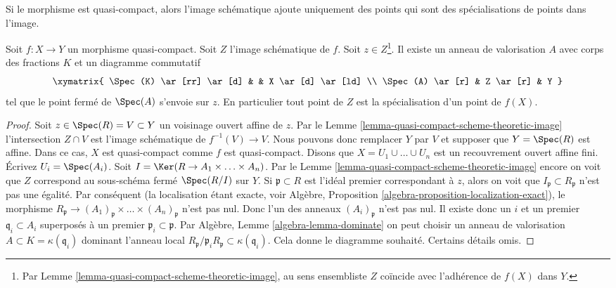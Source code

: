 \noindent
Si le morphisme est quasi-compact, alors l'image schématique ajoute uniquement
des points qui sont des spécialisations de points dans l'image.

\begin{lemma}
\label{lemma-reach-points-scheme-theoretic-image}
Soit $f : X \to Y$ un morphisme quasi-compact. Soit $Z$
l'image schématique de $f$. Soit $z \in Z$\footnote{Par
Lemme
\ref{lemma-quasi-compact-scheme-theoretic-image}, au sens ensembliste $Z$ coïncide avec l'adhérence de
$f(X)$ dans $Y$.}. Il existe un anneau
de valorisation $A$ avec corps des
fractions $K$ et un diagramme commutatif
$$
\xymatrix{
\Spec(K) \ar[rr] \ar[d] & & X \ar[d] \ar[ld] \\
\Spec(A) \ar[r] & Z \ar[r] & Y
}
$$
tel que le point fermé de $\Spec(A)$ s'envoie sur $z$. En particulier tout
point de $Z$ est la spécialisation d'un point de $f(X)$.
\end{lemma}

\begin{proof}
Soit $z \in \Spec(R) = V \subset Y$ un voisinage ouvert affine de
$z$. Par le Lemme
\ref{lemma-quasi-compact-scheme-theoretic-image} l'intersection $Z \cap V$ est l'image
schématique de $f^{-1}(V) \to V$. Nous pouvons donc
remplacer $Y$ par $V$ et supposer
que $Y = \Spec(R)$ est affine.
Dans ce cas, $X$ est quasi-compact comme
$f$ est quasi-compact.
Disons que $X = U_1 \cup \ldots \cup U_n$ est un recouvrement ouvert
affine fini. Écrivez $U_i = \Spec(A_i)$. Soit
$I = \Ker(R \to A_1 \times \ldots \times A_n)$. Par le Lemme \ref{lemma-quasi-compact-scheme-theoretic-image} encore on voit
que $Z$ correspond au sous-schéma fermé
$\Spec(R/I)$ sur $Y$. Si $\mathfrak p \subset R$
est l'idéal premier correspondant à
$z$, alors on voit que $I_{\mathfrak p} \subset R_{\mathfrak p}$
n'est pas une égalité. Par conséquent
(la localisation étant exacte, voir Algèbre, Proposition
\ref{algebra-proposition-localization-exact}),
le morphisme $R_{\mathfrak p} \to
(A_1)_{\mathfrak p} \times \ldots \times (A_n)_{\mathfrak p}$ n'est pas nul. Donc
l'un des anneaux $(A_i)_{\mathfrak p}$ n'est pas nul. Il existe
donc un $i$ et un premier $\mathfrak q_i \subset A_i$ superposés
à un premier $\mathfrak p_i \subset \mathfrak p$. Par Algèbre,
Lemme \ref{algebra-lemma-dominate} on peut choisir un anneau de valorisation
$A \subset K = \kappa(\mathfrak q_i)$ dominant l'anneau
local
$R_{\mathfrak p}/\mathfrak p_iR_{\mathfrak p} \subset \kappa(\mathfrak q_i)$. Cela donne le diagramme souhaité.
Certains détails omis.
\end{proof}

